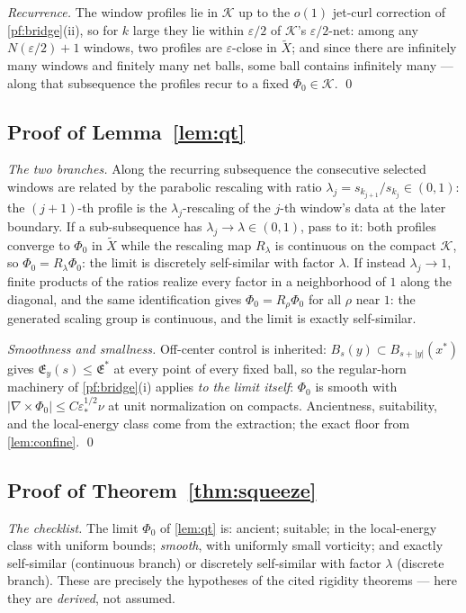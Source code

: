 \documentclass[11pt,letterpaper]{amsart}
\theoremstyle{definition}
\theoremstyle{remark}
\newcommand{\abs}[1]{\lvert #1 \rvert}
\begin{document}
\emph{Recurrence.} The window profiles lie in $\mathcal{K}$ up to the $o(1)$
jet-curl correction of \cref{pf:bridge}\textup{(ii)}, so for $k$ large they
lie within $\varepsilon/2$ of $\mathcal{K}$'s $\varepsilon/2$-net: among any
$N(\varepsilon/2)+1$ windows, two profiles are $\varepsilon$-close in
$\widetilde X$; and since there are infinitely many windows and finitely many
net balls, some ball contains infinitely many --- along that subsequence the
profiles recur to a fixed $\Phi_0\in\mathcal{K}$. \qed

\subsection{Proof of Lemma~\ref{lem:qt}}\label{pf:qt}
\emph{The two branches.} Along the recurring subsequence the consecutive
selected windows are related by the parabolic rescaling with ratio
$\lambda_j=s_{k_{j+1}}/s_{k_j}\in(0,1)$: the $(j{+}1)$-th profile is the
$\lambda_j$-rescaling of the $j$-th window's data at the later boundary. If a
sub-subsequence has $\lambda_j\to\lambda\in(0,1)$, pass to it: both profiles
converge to $\Phi_0$ in $\widetilde X$ while the rescaling map $R_\lambda$ is
continuous on the compact $\mathcal{K}$, so $\Phi_0=R_\lambda\Phi_0$: the
limit is discretely self-similar with factor $\lambda$. If instead
$\lambda_j\to1$, finite products of the ratios realize every factor in a
neighborhood of $1$ along the diagonal, and the same identification gives
$\Phi_0=R_\rho\Phi_0$ for all $\rho$ near $1$: the generated scaling group is
continuous, and the limit is exactly self-similar.

\emph{Smoothness and smallness.} Off-center control is inherited:
$B_s(y)\subset B_{s+\abs{y}}(x^*)$ gives
$\mathfrak{E}_y(s)\le\mathfrak{E}^*$ at every point of every fixed ball, so
the regular-horn machinery of \cref{pf:bridge}\textup{(i)} applies \emph{to
the limit itself}: $\Phi_0$ is smooth with
$\abs{\nabla\times\Phi_0}\le C\varepsilon_*^{1/2}\nu$ at unit normalization on
compacts. Ancientness, suitability, and the local-energy class come from the
extraction; the exact floor from \cref{lem:confine}. \qed

\subsection{Proof of Theorem~\ref{thm:squeeze}}\label{pf:squeeze}
\emph{The checklist.} The limit $\Phi_0$ of \cref{lem:qt} is: ancient;
suitable; in the local-energy class with uniform bounds; \emph{smooth}, with
uniformly small vorticity; and exactly self-similar (continuous branch) or
discretely self-similar with factor $\lambda$ (discrete branch). These are
precisely the hypotheses of the cited rigidity theorems --- here they are
\emph{derived}, not assumed.
\end{document}
